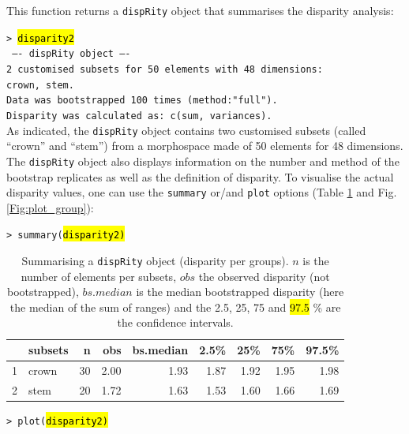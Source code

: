 \documentclass[12pt,letterpaper]{article}
\newcommand{\disp}{\texttt{dispRity} }
\begin{document}
This function returns a \disp object that summarises the disparity analysis:

\noindent \texttt{> \hl{disparity2}}\\
\noindent \texttt{ ---- dispRity object ---- }\\
\noindent \texttt{2 customised subsets for 50 elements with 48 dimensions:}\\
          \texttt{crown, stem.}\\
\noindent \texttt{Data was bootstrapped 100 times (method:"full").}\\
\noindent \texttt{Disparity was calculated as: c(sum, variances).}\\

\bigskip
As indicated, the \disp object contains two customised subsets (called ``crown'' and ``stem'') from a morphospace made of 50 elements for 48 dimensions.
The \disp object also displays information on the number and method of the bootstrap replicates as well as the definition of disparity.
To visualise the actual disparity values, one can use the \texttt{summary} or/and \texttt{plot} options (Table \ref{Tab:summary_group} and Fig. \ref{Fig:plot_group}):



\noindent \texttt{> summary(\hl{disparity2)}}

\begin{table}[ht]
\centering
\begin{tabular}{rlrrrrrrr}
  \hline
 & subsets & n & obs & bs.median & 2.5\% & 25\% & 75\% & 97.5\% \\ 
  \hline
1 & crown &  30 & 2.00 & 1.93 & 1.87 & 1.92 & 1.95 & 1.98 \\ 
  2 & stem &  20 & 1.72 & 1.63 & 1.53 & 1.60 & 1.66 & 1.69 \\ 
   \hline
\end{tabular}
\caption{Summarising a \disp object (disparity per groups). $n$ is the number of elements per subsets, $obs$ the observed disparity (not bootstrapped), $bs.median$ is the median bootstrapped disparity (here the median of the sum of ranges) and the 2.5, 25, 75 and
\hl{97.5}
\% are the confidence intervals.}
\label{Tab:summary_group}
\end{table}

\noindent \texttt{> plot(\hl{disparity2)}}
\end{document}
